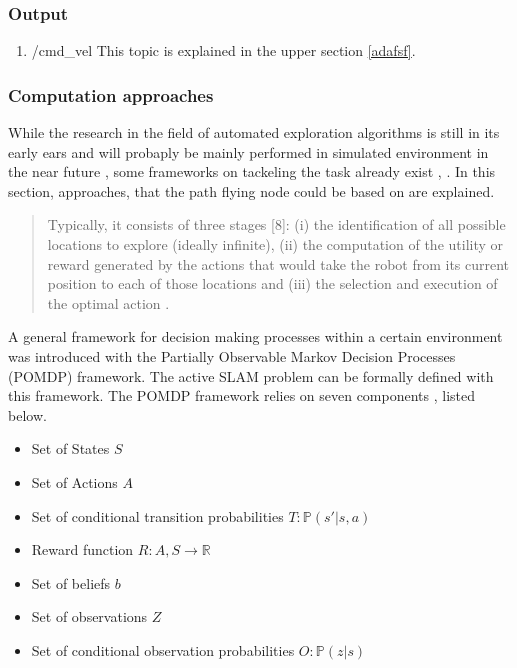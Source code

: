 	\subsubsection{Output}
	
	\begin{enumerate}
	\item{/cmd\_vel}
	This topic is explained in the upper section \ref{adafsf}.
	\end{enumerate}
	
	\subsubsection{Computation approaches}
	
	While the research in the field of automated exploration algorithms is still in its early ears \cite{early} and will probaply be mainly performed 
	in simulated environment in the near future \cite{deep}, some frameworks on tackeling the 
	task already exist \cite{early}, \cite{deep} \cite{accurat} \cite{lopez}. 
	In this section, approaches, that the path flying node could be based on are explained. 
	
	\begin{quote}
	Typically, it consists of three stages [8]: (i) the identification of all possible locations
to explore (ideally infinite), (ii) the computation of the utility or reward generated by the actions that
would take the robot from its current position to each of those locations and (iii) the selection and
execution of the optimal action \cite{deep}. 
\end{quote}

A general framework for decision making processes within a certain environment was introduced with the Partially Observable Markov Decision Processes (POMDP) framework. 
	The active SLAM problem can be formally defined with this framework. 
	The POMDP framework relies on seven components \cite{thesisvandenhof}, listed below. 
	
	\begin{itemize}
	\item{Set of States $S$}
	\item{Set of Actions $A$}
	\item{Set of conditional transition probabilities $T: \mathbb{P}(s'|s, a)$}
	\item{Reward function $R : A, S \rightarrow \mathbb{R}$}
	\item{Set of beliefs $b$}
	\item{Set of observations $Z$}
	\item{Set of conditional observation probabilities $O: \mathbb{P}(z|s)$}
	\end{itemize}
	

